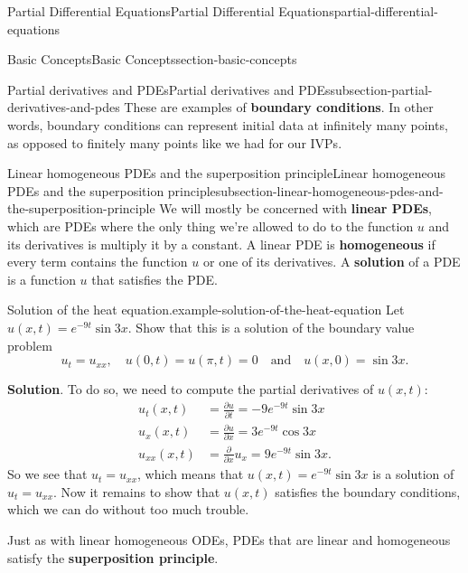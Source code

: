 \documentclass[oneside,10pt,]{book}
\newcommand{\terminology}[1]{\textbf{#1}}
\numberwithin{equation}{section}
\newcommand{\amp}{&}
\begin{document}
\begin{chapterptx}{Partial Differential Equations}{}{Partial Differential Equations}{}{}{partial-differential-equations}
\begin{sectionptx}{Basic Concepts}{}{Basic Concepts}{}{}{section-basic-concepts}
\begin{subsectionptx}{Partial derivatives and PDEs}{}{Partial derivatives and PDEs}{}{}{subsection-partial-derivatives-and-pdes}
These are examples of \terminology{boundary conditions}. In other words, boundary conditions can represent initial data at infinitely many points, as opposed to finitely many points like we had for our IVPs.%
\end{subsectionptx}
%
%
\typeout{************************************************}
\typeout{************************************************}
%
\begin{subsectionptx}{Linear homogeneous PDEs and the superposition principle}{}{Linear homogeneous PDEs and the superposition principle}{}{}{subsection-linear-homogeneous-pdes-and-the-superposition-principle}
\hypertarget{p-635}{}%
We will mostly be concerned with \terminology{linear PDEs}, which are PDEs where the only thing we're allowed to do to the function \(u\) and its derivatives is multiply it by a constant. A linear PDE is \terminology{homogeneous} if every term contains the function \(u\) or one of its derivatives. A \terminology{solution} of a PDE is a function \(u\) that satisfies the PDE.%
\begin{example}{Solution of the heat equation.}{example-solution-of-the-heat-equation}%
\hypertarget{p-636}{}%
Let \(u(x,t) = e^{-9t}\sin3x\). Show that this is a solution of the boundary value problem%
\begin{equation*}
u_{t} = u_{xx},\quad u(0,t) = u(\pi,t) = 0\quad\text{and}\quad u(x,0) = \sin3x.
\end{equation*}
%
\par\smallskip%
\noindent\textbf{Solution}.\hypertarget{solution-93}{}\quad%
\hypertarget{p-637}{}%
To do so, we need to compute the partial derivatives of \(u(x,t):\)%
%
\begin{align*}
u_{t}(x,t) \amp = \frac{\partial u}{\partial t} = -9e^{-9t}\sin3x \\
u_{x}(x,t) \amp = \frac{\partial u}{\partial x} = 3e^{-9t}\cos3x \\
u_{xx}(x,t) \amp = \frac{\partial}{\partial x}u_{x} = 9e^{-9t}\sin3x \text{.}
\end{align*}
\hypertarget{p-638}{}%
So we see that \(u_{t} = u_{xx}\), which means that \(u(x,t) = e^{-9t}\sin3x\) is a solution of \(u_{t} = u_{xx}\). Now it remains to show that \(u(x,t)\) satisfies the boundary conditions, which we can do without too much trouble.%
\end{example}
\hypertarget{p-639}{}%
Just as with linear homogeneous ODEs, PDEs that are linear and homogeneous satisfy the \terminology{superposition principle}.%

\end{subsectionptx}
\end{sectionptx}
\end{chapterptx}
\end{document}
